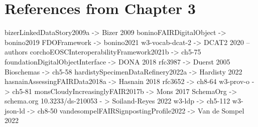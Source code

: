 
\section{References from Chapter 3}


bizerLinkedDataStory2009a -> Bizer 2009
boninoFAIRDigitalObject -> bonino2019
FDOFramework -> bonino2021
w3-vocab-dcat-2 -> DCAT2 2020 -- authors
corchoEOSCInteroperabilityFramework2021b -> ch5-75
foundationDigitalObjectInterface -> DONA 2018
rfc3987 -> Duerst 2005
Bioschemas -> ch5-58
hardistySpecimenDataRefinery2022a -> Hardisty 2022
hasnainAssessingFAIRData2018a -> Hasnain 2018
rfc3652 -> ch8-64
w3-prov-o -> ch5-81
monsCloudyIncreasinglyFAIR2017b -> Mons 2017
SchemaOrg -> schema.org
10.3233/ds-210053 - > Soiland-Reyes 2022
w3-ldp -> ch5-112
w3-json-ld -> ch8-50
vandesompelFAIRSignpostingProfile2022 -> Van de Sompel 2022

